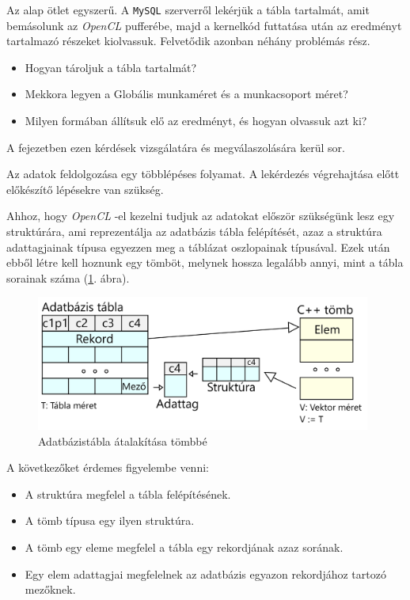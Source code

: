 
Az alap ötlet egyszerű. A \texttt{MySQL} szerverről lekérjük a tábla tartalmát, amit bemásolunk az \textit{OpenCL} pufferébe, majd a kernelkód futtatása után az eredményt tartalmazó részeket kiolvassuk. Felvetődik azonban néhány problémás rész.
\begin{itemize}
	\item Hogyan tároljuk a tábla tartalmát?
	\item Mekkora legyen a Globális munkaméret és a munkacsoport méret?
	\item Milyen formában állítsuk elő az eredményt, és hogyan olvassuk azt ki?
\end{itemize}
A fejezetben ezen kérdések vizsgálatára és megválaszolására kerül sor.


Az adatok feldolgozása egy többlépéses folyamat. A lekérdezés végrehajtása előtt előkészítő lépésekre van szükség.


Ahhoz, hogy \textit{OpenCL} -el kezelni tudjuk az adatokat először szükségünk lesz egy struktúrára, ami reprezentálja az adatbázis tábla felépítését, azaz a struktúra adattagjainak típusa egyezzen meg a táblázat oszlopainak típusával. Ezek után ebből létre kell hoznunk egy tömböt, melynek hossza legalább annyi, mint a tábla sorainak száma (\ref{fig:structure}. ábra).

\begin{figure}[h!]
\centering
\includegraphics[width=11cm]{images/data/structure.png}
\caption{Adatbázistábla átalakítása tömbbé}
\label{fig:structure}
\end{figure}

A következőket érdemes figyelembe venni:
\begin{itemize}
\item A struktúra megfelel a tábla felépítésének.
\item A tömb típusa egy ilyen struktúra.
\item A tömb egy eleme megfelel a tábla egy rekordjának azaz sorának.
\item Egy elem adattagjai megfelelnek az adatbázis egyazon rekordjához tartozó mezőknek.
\end{itemize}

